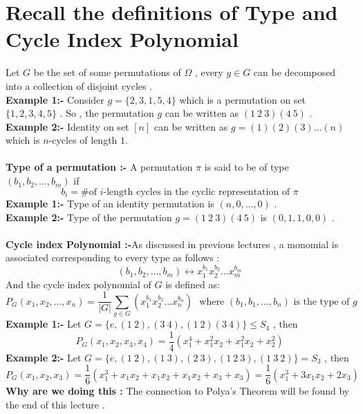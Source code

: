 \section{Recall the definitions of Type and Cycle Index Polynomial}
Let $G$ be the set of some permutations of $\Omega$ , every $g \in G$ can be decomposed into a collection of disjoint cycles .\\
\textbf{Example 1:-} Consider $g=\{2,3,1,5,4\}$ which is a permutation on set $\{1,2,3,4,5\}$ . So , the permutation $g$ can be written as $(1~2~3)(4~5)$ .\\
\textbf{Example 2:-} Identity on set $[n]$ can be written as $g=(1)(2)(3)\dots(n)$ which is $n$-cycles of length $1$.\\\\
\textbf{Type of a permutation :-} A permutation $\pi$ is said to be of type $(b_1,b_2,\dots,b_m)$ if 
$$b_i = \textrm{\# of $i$-length cycles in the cyclic representation of $\pi$}$$
\textbf{Example 1:-} Type of an identity permutation is $(n,0,\dots,0)$ .\\
\textbf{Example 2:-} Type of the permutation $g=(1~2~3)(4~5)$ is $(0,1,1,0,0)$ .\\\\
\textbf{Cycle index Polynomial :-}As discussed in previous lectures , a monomial is associated corresponding to every type as follows :
$$(b_1,b_2,\dots,b_m)\longleftrightarrow x_1^{b_1}x_2^{b_2}\dots x_m^{b_m}$$
And the cycle index polynomial of $G$ is defined as:
$$P_G(x_1,x_2,\dots,x_n)=\frac{1}{|G|}\sum_{g\in G}(x_1^{b_1}x_2^{b_2}\dots x_n^{b_n})~~~\textrm{where $(b_1,b_1,\dots,b_n)$ is the type of $g$}$$
\textbf{Example 1:-} Let $G=\{e,(1~2),(3~4),(1~2)(3~4)\}\leq S_4$ , then 
$$P_G(x_1,x_2,x_3,x_4) = \frac{1}{4}\left(x_1^{4}+x_1^{2}x_2+x_1^{2}x_2+x_2^{2}\right)$$
\textbf{Example 2:-} Let $G=\{e,(1~2),(1~3),(2~3),(1~2~3),(1~3~2)\}=S_3$ , then 
$$P_G(x_1,x_2,x_3) = \frac{1}{6}\left(x_1^{3}+x_{1}x_{2}+x_{1}x_{2}+x_{1}x_{2}+x_3+x_3\right)=\frac{1}{6}\left(x_1^{3}+3x_{1}x_{2}+2x_3\right)$$
\textbf{Why are we doing this :} The connection to Polya's Theorem will be found by the end of this lecture .
